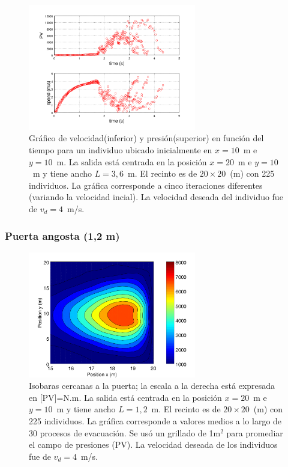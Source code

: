 \begin{figure}[H]
    \centering
    \includegraphics[height=5.5cm]{figuras/pv_vel_t_100_3_6.png}
    \caption[width=5cm]{Gráfico de velocidad(inferior) y presión(superior) en función del tiempo para un individuo ubicado inicialmente en $x=10$~m e $y=10$~m.  La salida está centrada en la posición $x=20$~m e $y=10$~m y tiene ancho $L=3,6$~m. El recinto es de $20\times 20$~(m) con 225 individuos. La gráfica corresponde a cinco iteraciones diferentes (variando la velocidad incial). La velocidad deseada del individuo fue de $v_d=4$~m/s.}
    \label{pv_vel_t_100_3_6}
\end{figure}

\subsubsection{Puerta angosta (1,2 m)}

\begin{figure}[H]
    \centering
    \includegraphics[height=5.5cm]{figuras/press_225p_v4_onedoor_1_2.png}
    \caption[width=5cm]{Isobaras cercanas a la puerta; la escala a la derecha está expresada en [PV]=N.m. La salida está centrada en la posición $x=20$~m e $y=10$~m y tiene ancho $L=1,2$~m. El recinto es de $20\times 20$~(m) con 225 individuos. La gráfica corresponde a valores medios a lo largo de 30 procesos de evacuación. Se usó un grillado de 1m$^2$ para promediar el campo de presiones (PV). La velocidad deseada de los individuos fue de $v_d=4$~m/s.}
    \label{isobaras_1_2m}
\end{figure}

